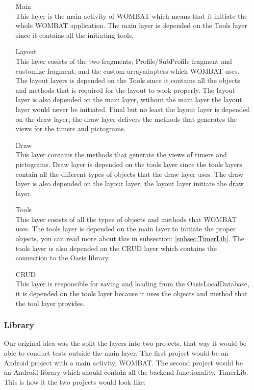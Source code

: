 \begin{itemize}
	\item[Main] \hfill \\	This layer is the main activity of WOMBAT which means that it initiate the whole WOMBAT application. The main layer is depended on the Tools layer since it contains all the initiating tools. 
	\item [Layout] \hfill \\	This layer cosists of the two fragments; Profile/SubProfile fragment and customize fragment, and the custom arrayadapters which WOMBAT uses. The layout layers is depended on the Tools since it contains all the objects and methods that is required for the layout to work properly. The layout layer is also depended on the main layer, without the main layer the layout layer would never be initiated. Final but no least the layout layer is depended on the draw layer, the draw layer delivers the methods that generates the views for the timers and pictograms.
	\item [Draw] \hfill \\	This layer contains the methods that generate the views of timers and pictograms. Draw layer is depended on the tools layer since the tools layers contain all the different types of objects that the draw layer uses. The draw layer is also depended on the layout layer, the layout layer initiate the draw layer.
	\item [Tools] \hfill \\	This layer cosists of all the types of objects and methods that WOMBAT uses. The tools layer is depended on the main layer to initiate the proper objects, you can read more about this in subsection: \ref{subsec:TimerLib}. The tools layer is also depended on the CRUD layer which contains the connection to the Oasis library.
	\item [CRUD] \hfill \\	This layer is responsible for saving and loading from the OasisLocalDatabase, it is depended on the tools layer because it uses the objects and method that the tool layer provides.
\end{itemize}

\subsubsection{Library}

Our original idea was the split the layers into two projects, that way it would be able to conduct tests outside the main layer. The first project would be an Android project with a main activity, WOMBAT. The second project would be an Android library which should contain all the backend functionality, TimerLib. This is how it the two projects would look like:

